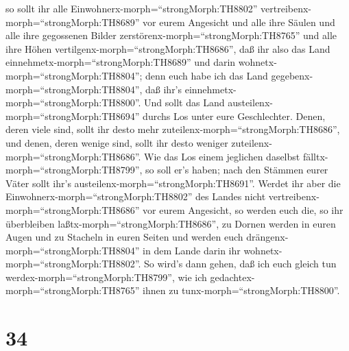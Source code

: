  so sollt ihr alle Einwohnerx-morph=``strongMorph:TH8802''
vertreibenx-morph=``strongMorph:TH8689'' vor eurem Angesicht und alle
ihre Säulen und alle ihre gegossenen Bilder
zerstörenx-morph=``strongMorph:TH8765'' und alle ihre Höhen
vertilgenx-morph=``strongMorph:TH8686'',  daß ihr also das
Land einnehmetx-morph=``strongMorph:TH8689'' und darin
wohnetx-morph=``strongMorph:TH8804''; denn euch habe ich das Land
gegebenx-morph=``strongMorph:TH8804'', daß ihr's
einnehmetx-morph=``strongMorph:TH8800''.  Und sollt das
Land austeilenx-morph=``strongMorph:TH8694'' durchs Los unter eure
Geschlechter. Denen, deren viele sind, sollt ihr desto mehr
zuteilenx-morph=``strongMorph:TH8686'', und denen, deren wenige sind,
sollt ihr desto weniger zuteilenx-morph=``strongMorph:TH8686''. Wie das
Los einem jeglichen daselbst fälltx-morph=``strongMorph:TH8799'', so
soll er's haben; nach den Stämmen eurer Väter sollt ihr's
austeilenx-morph=``strongMorph:TH8691''.  Werdet ihr aber
die Einwohnerx-morph=``strongMorph:TH8802'' des Landes nicht
vertreibenx-morph=``strongMorph:TH8686'' vor eurem Angesicht, so werden
euch die, so ihr überbleiben laßtx-morph=``strongMorph:TH8686'', zu
Dornen werden in euren Augen und zu Stacheln in euren Seiten und werden
euch drängenx-morph=``strongMorph:TH8804'' in dem Lande darin ihr
wohnetx-morph=``strongMorph:TH8802''.  So wird's dann
gehen, daß ich euch gleich tun werdex-morph=``strongMorph:TH8799'', wie
ich gedachtex-morph=``strongMorph:TH8765'' ihnen zu
tunx-morph=``strongMorph:TH8800''.

\hypertarget{section-33}{%
\section{34}\label{section-33}}

